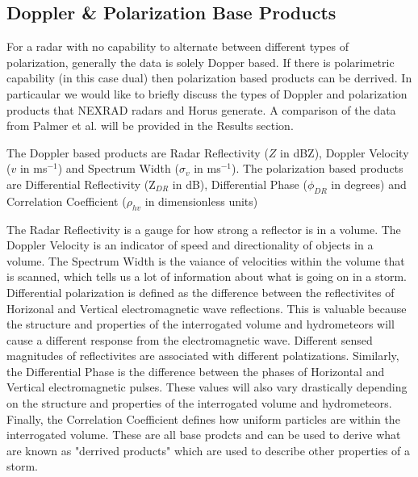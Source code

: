 \documentclass[conference]{IEEEtran}
\begin{document}
\subsection{Doppler \& Polarization Base Products}
\par For a radar with no capability to alternate between different types of polarization, generally the data is solely Dopper based\cite{wolffDualPol}. If there is polarimetric capability (in this case dual) then polarization based products can be derrived. In particaular we would like to briefly discuss the types of Doppler and polarization products that NEXRAD radars and Horus generate. A comparison of the data from Palmer et al. \cite{b1} will be provided in the Results section. 
\par The Doppler based products are Radar Reflectivity ($Z$ in dBZ), Doppler Velocity ($v$ in ms$^{-1}$) and Spectrum Width ($
\sigma_v$ in ms$^{-1}$). The polarization based products are Differential Reflectivity (Z$_{DR}$ in dB), Differential Phase ($\phi_{DR}$ in degrees) and Correlation Coefficient ($\rho_{hv}$ in dimensionless units)
\par The Radar Reflectivity is a gauge for how strong a reflector is in a volume. The Doppler Velocity is an indicator of speed and directionality of objects in a volume. The Spectrum Width is the vaiance of velocities within the volume that is scanned, which tells us a lot of information about what is going on in a storm. Differential polarization is defined as the difference between the reflectivites of Horizonal and Vertical electromagnetic wave reflections. This is valuable because the structure and properties of the interrogated volume and hydrometeors will cause a different response from the electromagnetic wave. Different sensed magnitudes of reflectivites are associated with different polatizations. Similarly, the Differential Phase is the difference between the phases of Horizontal and Vertical electromagnetic pulses. These values will also vary drastically depending on the structure and properties of the interrogated volume and hydrometeors. Finally, the Correlation Coefficient defines how uniform particles are within the interrogated volume. These are all base prodcts and can be used to derive what are known as "derrived products" which are used to describe other properties of a storm.
\end{document}
